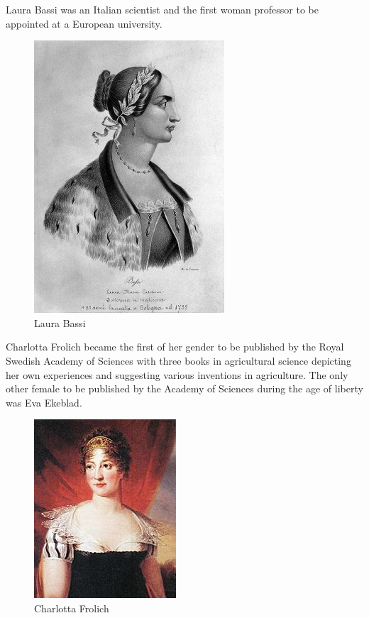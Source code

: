 \documentclass[a4paper,10pt]{article}
\begin{document}
\newblock
Laura Bassi was an Italian scientist and the first woman professor to be appointed at a European university\cite{laura}.

\begin{center}
\begin{figure}[h]
\centering
 \includegraphics[scale=0.9]{laura.png}
 \caption{Laura Bassi}
\end{figure}
\end{center}

\newblock
Charlotta Frolich became the first of her gender to be published by the Royal Swedish Academy of Sciences with three books in agricultural science depicting her own experiences and suggesting various inventions in agriculture. The only other female to be published by the Academy of Sciences during the age of liberty was Eva Ekeblad\cite{frolich}.

\begin{center}
\begin{figure}[h]
\centering
 \includegraphics[scale=0.7]{charlotta.jpg}
 \caption{Charlotta Frolich}
\end{figure}
\end{center}
\end{document}
